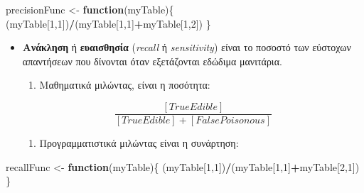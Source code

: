 \documentclass[
]{article}
\newenvironment{Shaded}{\begin{snugshade}}{\end{snugshade}}
\newcommand{\ControlFlowTok}[1]{\textcolor[rgb]{0.13,0.29,0.53}{\textbf{#1}}}
\newcommand{\DecValTok}[1]{\textcolor[rgb]{0.00,0.00,0.81}{#1}}
\newcommand{\NormalTok}[1]{#1}
\newcommand{\OtherTok}[1]{\textcolor[rgb]{0.56,0.35,0.01}{#1}}
\newcommand{\SpecialCharTok}[1]{\textcolor[rgb]{0.81,0.36,0.00}{\textbf{#1}}}
\providecommand{\tightlist}{%
  \setlength{\itemsep}{0pt}\setlength{\parskip}{0pt}}
\begin{document}
\begin{Shaded}
\begin{Highlighting}[]
\NormalTok{precisionFunc }\OtherTok{\textless{}{-}} \ControlFlowTok{function}\NormalTok{(myTable)\{}
\NormalTok{  (myTable[}\DecValTok{1}\NormalTok{,}\DecValTok{1}\NormalTok{])}\SpecialCharTok{/}\NormalTok{(myTable[}\DecValTok{1}\NormalTok{,}\DecValTok{1}\NormalTok{]}\SpecialCharTok{+}\NormalTok{myTable[}\DecValTok{1}\NormalTok{,}\DecValTok{2}\NormalTok{])}
\NormalTok{\}}
\end{Highlighting}
\end{Shaded}

\begin{itemize}
\item
  \textbf{Ανάκληση} ή \textbf{ευαισθησία} (\emph{recall} ή
  \emph{sensitivity}) είναι το ποσοστό των εύστοχων απαντήσεων που
  δίνονται όταν εξετάζονται εδώδιμα μανιτάρια.

  \begin{enumerate}
  \def\labelenumi{\arabic{enumi}.}
  \tightlist
  \item
    Μαθηματικά μιλώντας, είναι η ποσότητα:
  \end{enumerate}

  \[
  \dfrac{[TrueEdible]}{[TrueEdible]+[FalsePoisonous]}
  \]

  \begin{enumerate}
  \def\labelenumi{\arabic{enumi}.}
  \setcounter{enumi}{1}
  \tightlist
  \item
    Προγραμματιστικά μιλώντας είναι η συνάρτηση:
  \end{enumerate}
\end{itemize}

\begin{Shaded}
\begin{Highlighting}[]
\NormalTok{recallFunc }\OtherTok{\textless{}{-}} \ControlFlowTok{function}\NormalTok{(myTable)\{}
\NormalTok{  (myTable[}\DecValTok{1}\NormalTok{,}\DecValTok{1}\NormalTok{])}\SpecialCharTok{/}\NormalTok{(myTable[}\DecValTok{1}\NormalTok{,}\DecValTok{1}\NormalTok{]}\SpecialCharTok{+}\NormalTok{myTable[}\DecValTok{2}\NormalTok{,}\DecValTok{1}\NormalTok{])}
\NormalTok{\}}
\end{Highlighting}
\end{Shaded}
\end{document}
